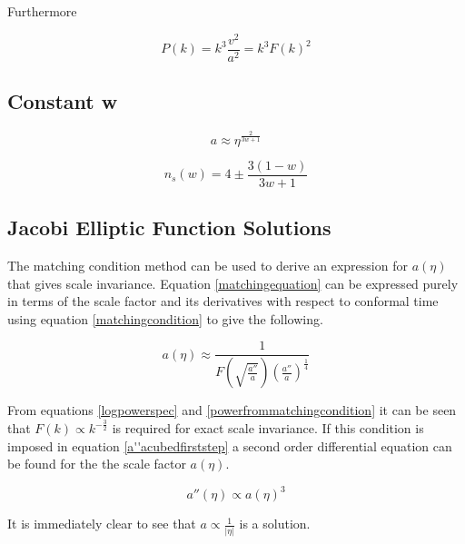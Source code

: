\documentclass[12pt]{article} %
\begin{document}
Furthermore

\begin{equation}\label{powerfrommatchingcondition}
P(k) = k^{3}\frac{v^{2}}{a^{2}} = k^{3}F(k)^{2}
\end{equation}

\subsection{Constant w}



\begin{equation}\label{generalisedscalefactorinw}
a\approx\eta^{\frac{2}{3w+1}}
\end{equation}

\begin{equation}\label{nsintermsofw}
n_{s}(w)=4\pm\frac{3(1-w)}{3w+1}
\end{equation}

\subsection{Jacobi Elliptic Function Solutions}

The matching condition method can be used to derive an expression for $a(\eta)$ that gives scale invariance. Equation \ref{matchingequation} can be expressed purely in terms of the scale factor and its derivatives with respect to conformal time using equation \ref{matchingcondition} to give the following.

\begin{equation}\label{a''acubedfirststep}
a(\eta) \approx \frac{1}{F\left(\sqrt{\frac{a''}{a}}\right)\left(\frac{a''}{a}\right)^{\frac{1}{4}}}
\end{equation}

From equations \ref{logpowerspec} and \ref{powerfrommatchingcondition} it can be seen that $F(k)\propto k^{-\frac{3}{2}}$ is required for exact scale invariance. If this condition is imposed in equation \ref{a''acubedfirststep} a second order differential equation can be found for the the scale factor $a(\eta)$.

\begin{equation}\label{aproptoacubed}
a''(\eta) \propto a(\eta)^{3}
\end{equation}

It is immediately clear to see that $ a \propto \frac{1}{| \eta |} $ is a solution.

\end{document}
